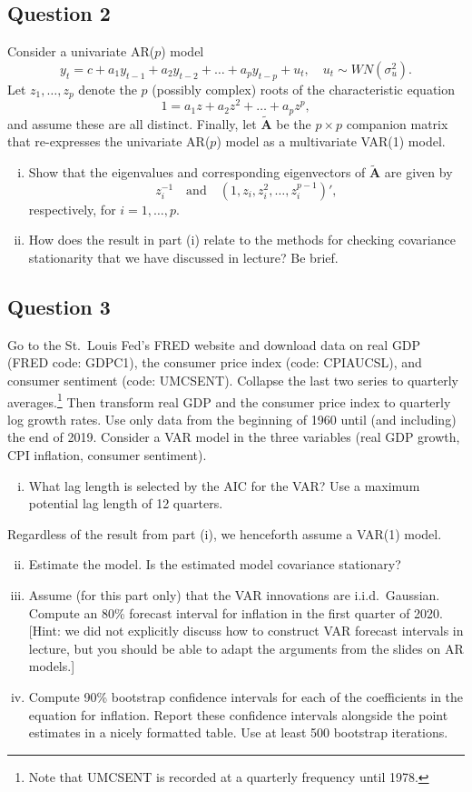 \documentclass[12pt]{article}
\theoremstyle{plain}
\begin{document}
\subsection*{Question 2}
Consider a univariate AR($p$) model
\[y_t = c + a_1y_{t-1} + a_2 y_{t-2} + \dots + a_p y_{t-p} + u_t,\quad u_t \sim \mathit{WN}(\sigma_u^2).\]
Let $z_1,\dots,z_p$ denote the $p$ (possibly complex) roots of the characteristic equation
\[1 = a_1 z + a_2 z^2 + \dots + a_p z^p,\]
and assume these are all distinct. Finally, let $\tilde{\boldsymbol{A}}$ be the $p \times p$ companion matrix that re-expresses the univariate AR($p$) model as a multivariate VAR(1) model.
\begin{enumerate}[i)]
\item Show that the eigenvalues and corresponding eigenvectors of $\tilde{\boldsymbol{A}}$ are given by
\[z_i^{-1}\quad \text{and} \quad (1,z_i,z_i^2,\dots,z_i^{p-1})',\]
respectively, for $i=1,\dots,p$.
\item How does the result in part (i) relate to the methods for checking covariance stationarity that we have discussed in lecture? Be brief.
\end{enumerate}

\subsection*{Question 3}
Go to the St.\ Louis Fed's FRED website and download data on real GDP (FRED code: GDPC1), the consumer price index (code: CPIAUCSL), and consumer sentiment (code: UMCSENT). Collapse the last two series to quarterly averages.\footnote{Note that UMCSENT is recorded at a quarterly frequency until 1978.} Then transform real GDP and the consumer price index to quarterly log growth rates. Use only data from the beginning of 1960 until (and including) the end of 2019. Consider a VAR model in the three variables (real GDP growth, CPI inflation, consumer sentiment).

\begin{enumerate}[i)]
\item What lag length is selected by the AIC for the VAR? Use a maximum potential lag length of 12 quarters.
\end{enumerate}
Regardless of the result from part (i), we henceforth assume a VAR(1) model.
\begin{enumerate}[i)]
\setcounter{enumi}{1}
\item Estimate the model. Is the estimated model covariance stationary?
\item Assume (for this part only) that the VAR innovations are i.i.d.\ Gaussian. Compute an 80\% forecast interval for inflation in the first quarter of 2020. [Hint: we did not explicitly discuss how to construct VAR forecast intervals in lecture, but you should be able to adapt the arguments from the slides on AR models.]
\item Compute 90\% bootstrap confidence intervals for each of the coefficients in the equation for inflation. Report these confidence intervals alongside the point estimates in a nicely formatted table. Use at least 500 bootstrap iterations.
\end{enumerate}
\end{document}
